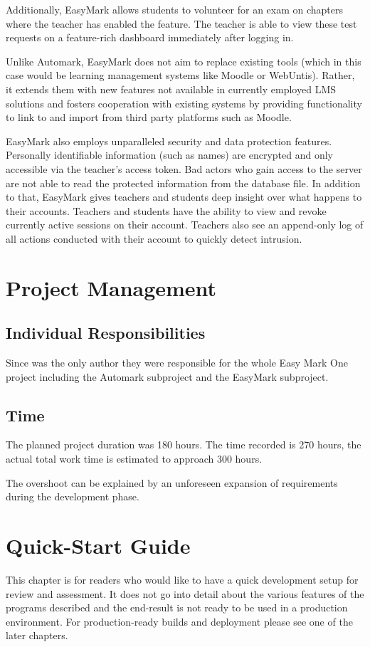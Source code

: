 \documentclass[12pt,a4paper,oneside]{report}
\newcommand{\IfPrivateBuild}[2]{#1}
\newcommand{\IfPrivateBuild}[2]{#2}
\begin{document}
	Additionally, EasyMark allows students to volunteer for an exam on chapters where the teacher has enabled the feature. The teacher is able to view these test requests on a feature-rich dashboard immediately after logging in.

	Unlike Automark, EasyMark does not aim to replace existing tools (which in this case would be learning management systems like Moodle or WebUntis). Rather, it extends them with new features not available in currently employed LMS solutions and fosters cooperation with existing systems by providing functionality to link to and import from third party platforms such as Moodle.

	EasyMark also employs unparalleled security and data protection features. Personally identifiable information (such as names) are encrypted and only accessible via the teacher's access token. Bad actors who gain access to the server are not able to read the protected information from the database file. In addition to that, EasyMark gives teachers and students deep insight over what happens to their accounts. Teachers and students have the ability to view and revoke currently active sessions on their account. Teachers also see an append-only log of all actions conducted with their account to quickly detect intrusion.

	\chapter{Project Management}

	\section{Individual Responsibilities}
	Since \IfPrivateBuild{\EmRealAuthorName}{T0astBread} was the only author they were responsible for the whole Easy Mark One project including the Automark subproject and the EasyMark subproject.

	\section{Time}
	The planned project duration was 180 hours. The time recorded is 270 hours, the actual total work time is estimated to approach 300 hours.

	The overshoot can be explained by an unforeseen expansion of requirements during the development phase.

	\iffalse
	\chapter{Quick-Start Guide}
	This chapter is for readers who would like to have a quick development setup for review and assessment. It does not go into detail about the various features of the programs described and the end-result is not ready to be used in a production environment. For production-ready builds and deployment please see one of the later chapters. %
\end{document}
